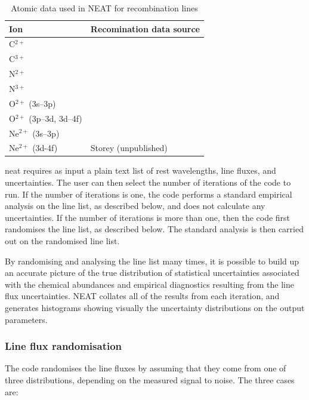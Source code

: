\documentclass[useAMS,usenatbib]{mn2e}
\begin{document}
\begin{table}
\begin{tabular}{ll}
\hline
Ion & Recomination data source \\
\hline
C$^{2+}$ & \citet{2000AAS..142...85D} \\
C$^{3+}$ & \citet{1991AA...251..680P} \\
N$^{2+}$ & \citet{1990ApJS...73..513E} \\
N$^{3+}$ & \citet{1991AA...251..680P} \\
O$^{2+}$ (3s--3p) & \citet{1994AA...282..999S} \\
O$^{2+}$ (3p--3d, 3d--4f) & \citet{1995MNRAS.272..369L} \\
Ne$^{2+}$ (3s--3p)& \citet{1998AAS..133..257K} \\
Ne$^{2+}$ (3d-4f) & Storey (unpublished) \\
\hline
\end{tabular}
\label{RL_atomic_data}
\caption{Atomic data used in {\sc NEAT} for recombination lines}
\end{table}

{\sc neat} requires as input a plain text list of rest wavelengths, line fluxes, and uncertainties.  The user can then select the number of iterations of the code to run.  If the number of iterations is one, the code performs a standard empirical analysis on the line list, as described below, and does not calculate any uncertainties.  If the number of iterations is more than one, then the code first randomises the line list, as described below.  The standard analysis is then carried out on the randomised line list.

By randomising and analysing the line list many times, it is possible to build up an accurate picture of the true distribution of statistical uncertainties associated with the chemical abundances and empirical diagnostics resulting from the line flux uncertainties. {\sc NEAT} collates all of the results from each iteration, and generates histograms showing visually the uncertainty distributions on the output parameters.

\subsubsection{Line flux randomisation}
\label{randomising}

The code randomises the line fluxes by assuming that they come from one of three distributions, depending on the measured signal to noise.  The three cases are:
\end{document}
